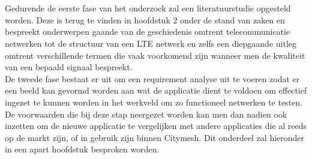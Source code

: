 
\chapter{}%
\label{ch:methodologie}


Gedurende de eerste fase van het onderzoek zal een literatuurstudie opgesteld worden. Deze is terug te vinden in hoofdstuk 2 onder de stand van zaken en bespreekt onderwerpen gaande van de geschiedenis omtrent telecommunicatie netwerken tot de structuur van een LTE netwerk en zelfs een diepgaande uitleg omtrent verschillende termen die vaak voorkomend zijn wanneer men de kwaliteit van een bepaald signaal bespreekt. \\

De tweede fase bestaat er uit om een requirement analyse uit te voeren zodat er een beeld kan gevormd worden aan wat de applicatie dient te voldoen om effectief ingezet te kunnen worden in het werkveld om zo functioneel netwerken te testen. De voorwaarden die bij deze stap neergezet worden kan men dan nadien ook inzetten om de nieuwe applicatie te vergelijken met andere applicaties die al reeds op de markt zijn, of in gebruik zijn binnen Citymesh. Dit onderdeel zal hieronder in een apart hoofdstuk besproken worden. \\


